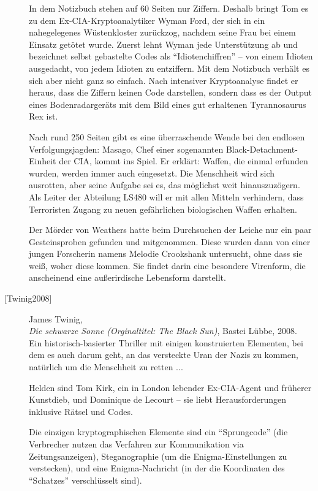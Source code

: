 \begin{description}
    In dem Notizbuch stehen auf 60 Seiten nur Ziffern. Deshalb bringt Tom es zu dem
    Ex-CIA-Kryptoanalytiker Wyman Ford, der sich in ein nahegelegenes Wüstenkloster
    zurückzog, nachdem seine Frau bei einem Einsatz getötet wurde.
    Zuerst lehnt Wyman jede Unterstützung ab und bezeichnet selbst gebastelte Codes
    als "`Idiotenchiffren"' -- von einem Idioten ausgedacht, von jedem Idioten zu
    entziffern. Mit dem Notizbuch verhält es sich aber nicht ganz so einfach. Nach
    intensiver Kryptoanalyse findet er heraus, dass die Ziffern keinen Code
    darstellen, sondern dass es der Output eines Bodenradargeräts mit dem Bild
    eines gut erhaltenen Tyrannosaurus Rex ist.

    Nach rund 250 Seiten gibt es eine überraschende Wende bei den endlosen
    Verfolgungsjagden: Masago, Chef einer sogenannten Black-Detachment-Einheit der CIA,
    kommt ins Spiel. Er erklärt: Waffen, die einmal erfunden wurden, werden immer auch
    eingesetzt. Die Menschheit wird sich ausrotten, aber seine Aufgabe sei es, das
    möglichst weit hinauszuzögern. Als Leiter der Abteilung LS480 will er mit allen
    Mitteln verhindern, dass Terroristen Zugang zu neuen gefährlichen biologischen
    Waffen erhalten.

    Der Mörder von Weathers hatte beim Durchsuchen der Leiche nur ein paar Gesteinsproben
    gefunden und mitgenommen. Diese wurden dann von einer jungen Forscherin namens Melodie
    Crookshank untersucht, ohne dass sie weiß, woher diese kommen. Sie findet darin eine
    besondere Virenform, die anscheinend eine außerirdische Lebensform darstellt.\\


\item[\textrm{[Twinig2008]}] 
    James Twinig, \\
    {\em Die schwarze Sonne (Orginaltitel: The Black Sun)}, Bastei Lübbe, 2008. \\
    Ein historisch-basierter Thriller mit einigen konstruierten Elementen, bei dem
    es auch darum geht, an das versteckte Uran der Nazis zu kommen, natürlich um die
    Menschheit zu retten ...

    Helden sind Tom Kirk, ein in London lebender Ex-CIA-Agent und früherer Kunstdieb,
    und Dominique de Lecourt -- sie liebt Herausforderungen inklusive Rätsel und Codes.

    Die einzigen kryptographischen Elemente sind ein "`Sprungcode"' (die Verbrecher
    nutzen das Verfahren zur Kommunikation via Zeitungsanzeigen), Steganographie
    (um die Enigma-Einstellungen zu verstecken), und eine Enigma-Nachricht (in der die
    Koordinaten des "`Schatzes"' verschlüsselt sind).


\end{description}
